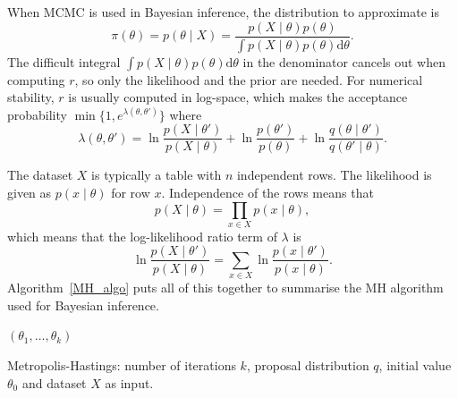 \documentclass[english,twoside,openright]{HYgraduMLDS}
\newcommand{\dx}{\mathrm{d}}
\begin{document}
When MCMC is used in Bayesian inference, the distribution to approximate is 
\[
    \pi(\theta) = p(\theta \mid X) = \frac{p(X \mid \theta)p(\theta)}
    {\int p(X\mid \theta)p(\theta)\dx\theta}.
\]
The difficult integral \(\int p(X\mid \theta)p(\theta)\dx\theta\) in the denominator
cancels out when computing \(r\), so only the likelihood and the prior are needed. 
For numerical stability, \(r\) is usually computed in 
log-space, which makes the acceptance probability
\(\min\{1, e^{\lambda(\theta, \theta')}\}\) where 
\begin{equation}\label{lambda_equation}
    \lambda(\theta, \theta') = \ln \frac{p(X\mid \theta')}{p(X\mid \theta)}
    + \ln \frac{p(\theta')}{p(\theta)}
    + \ln \frac{q(\theta\mid \theta')}{q(\theta'\mid \theta)}.
\end{equation}

The dataset \(X\) is typically a table with \(n\) independent rows.
The likelihood is given as \(p(x\mid \theta)\)
for row \(x\). Independence of the rows means that
\[
    p(X\mid \theta) = \prod_{x\in X} p(x\mid \theta),
\]
which means that the log-likelihood ratio term of \(\lambda\) is
\[
    \ln \frac{p(X\mid \theta')}{p(X\mid \theta)}
    = \sum_{x\in X} \ln\frac{p(x\mid \theta')}{p(x\mid \theta)}.
\]
Algorithm~\ref{MH_algo} puts all of this together to summarise the MH 
algorithm used for Bayesian inference.

\begin{algorithm}[H]\label{MH_algo}
    \SetAlgoLined
    \Return \((\theta_1, \dotsc, \theta_k)\)
    \caption{
        Metropolis-Hastings: number of iterations \(k\), proposal 
        distribution \(q\), initial value \(\theta_0\) and
        dataset \(X\) as input.
    }
\end{algorithm}
\end{document}
